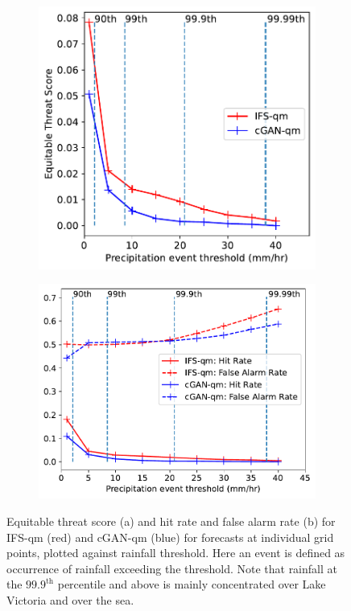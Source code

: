 \documentclass{article}
\begin{document}
\begin{figure}[ht]
    \centering
     \begin{subfigure}[t]{0.45\textwidth}

     \includegraphics[width=\textwidth]{images/ets_final-nologs_217600.pdf}
     \caption{}
     \end{subfigure}
     \hfill
     \centering
     \begin{subfigure}[t]{0.49\textwidth}
     \includegraphics[width=\textwidth]{images/hit_rate_final-nologs_217600.pdf}
     \caption{}
     \end{subfigure}
     \caption{ Equitable threat score (a) and hit rate and false alarm rate (b) for IFS-qm (red) and cGAN-qm (blue) for forecasts at individual grid points, plotted against rainfall threshold. Here an event is defined as occurrence of rainfall exceeding the threshold. Note that rainfall at the $99.9^{\text{th}}$ percentile and above is mainly concentrated over Lake Victoria and over the sea.}
     \label{fig:ets}
\end{figure}
\end{document}
